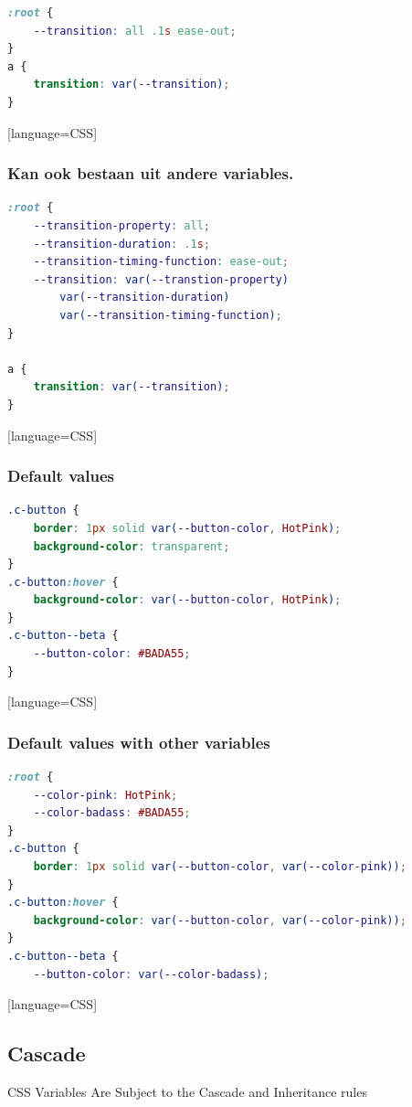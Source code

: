 \documentclass{article}
\begin{document}
\begin{lstlisting}[language=CSS]
:root {
    --transition: all .1s ease-out;
}
a {
    transition: var(--transition);
}   
\end{lstlisting}[language=CSS]

\subsubsection{Kan ook bestaan uit andere variables.}

\begin{lstlisting}[language=CSS]
:root {
    --transition-property: all;
    --transition-duration: .1s;
    --transition-timing-function: ease-out;
    --transition: var(--transtion-property) 
        var(--transition-duration) 
        var(--transition-timing-function);
}

a {
    transition: var(--transition);
}
\end{lstlisting}[language=CSS]

\subsubsection{Default values}

\begin{lstlisting}[language=CSS]
.c-button {
    border: 1px solid var(--button-color, HotPink);
    background-color: transparent;
}
.c-button:hover {
    background-color: var(--button-color, HotPink);
}
.c-button--beta {
    --button-color: #BADA55;
}
\end{lstlisting}[language=CSS]

\subsubsection{Default values with other variables}

\begin{lstlisting}[language=CSS]
:root {
    --color-pink: HotPink;
    --color-badass: #BADA55;
}
.c-button {
    border: 1px solid var(--button-color, var(--color-pink));
}
.c-button:hover {
    background-color: var(--button-color, var(--color-pink));
}
.c-button--beta {
    --button-color: var(--color-badass);
\end{lstlisting}[language=CSS]

\subsection{Cascade}
CSS Variables Are Subject to the Cascade and Inheritance rules
\end{document}
